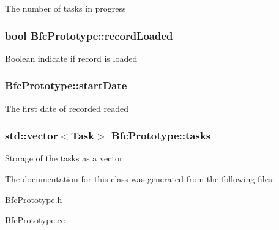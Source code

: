 The number of tasks in progress \hypertarget{classBfcPrototype_ac719ad28f80b4c8955ba516ac68471cc}{
\subsubsection[{record\-Loaded}]{\setlength{\rightskip}{0pt plus 5cm}bool Bfc\-Prototype\-::record\-Loaded\hspace{0.3cm}{\ttfamily [private]}}}\label{classBfcPrototype_ac719ad28f80b4c8955ba516ac68471cc}
Boolean indicate if record is loaded \hypertarget{classBfcPrototype_a636fde08f1c5518862f9d2603f73ebae}{
\subsubsection[{start\-Date}]{ Bfc\-Prototype\-::start\-Date\hspace{0.3cm}{\ttfamily [private]}}}\label{classBfcPrototype_a636fde08f1c5518862f9d2603f73ebae}
The first date of recorded readed \hypertarget{classBfcPrototype_a2724416668b0a82b442df12f90360e95}{
\subsubsection[{tasks}]{\setlength{\rightskip}{0pt plus 5cm}std\-::vector$<${\bf Task}$>$ Bfc\-Prototype\-::tasks\hspace{0.3cm}{\ttfamily [private]}}}\label{classBfcPrototype_a2724416668b0a82b442df12f90360e95}
Storage of the tasks as a vector 

The documentation for this class was generated from the following files\-:\begin{DoxyCompactItemize}
\item 
\hyperlink{BfcPrototype_8h}{Bfc\-Prototype.\-h}\item 
\hyperlink{BfcPrototype_8cc}{Bfc\-Prototype.\-cc}\end{DoxyCompactItemize}

